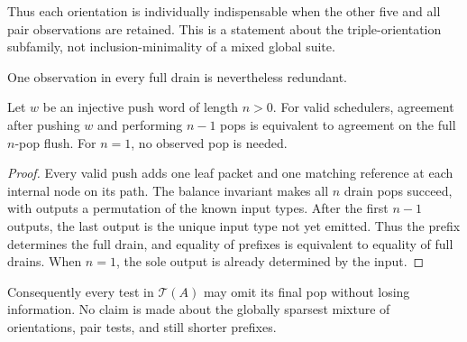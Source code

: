 Thus each orientation is individually indispensable when the other five and
all pair observations are retained.  This is a statement about the
triple-orientation subfamily, not inclusion-minimality of a mixed global
suite.

One observation in every full drain is nevertheless redundant.

\begin{proposition}
\label{prop:one-pop-redundancy}
Let \(w\) be an injective push word of length \(n>0\).  For valid schedulers,
agreement after pushing \(w\) and performing \(n-1\) pops is equivalent to
agreement on the full \(n\)-pop flush.  For \(n=1\), no observed pop is needed.
\end{proposition}

\begin{proof}
Every valid push adds one leaf packet and one matching reference at each
internal node on its path.  The balance invariant makes all \(n\) drain pops
succeed, with outputs a permutation of the known input types.  After the
first \(n-1\) outputs, the last output is the unique input type not yet
emitted.  Thus the prefix determines the full drain, and equality of prefixes
is equivalent to equality of full drains.  When \(n=1\), the sole output is
already determined by the input.
\end{proof}

Consequently every test in \(\mathcal T(A)\) may omit its final pop without
losing information.  No claim is made about the globally sparsest mixture of
orientations, pair tests, and still shorter prefixes.
